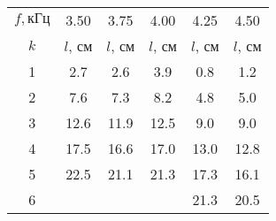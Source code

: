\begin{tabular}{cccccc}
\toprule
$f, \text{кГц}$ & 3.50 & 3.75 & 4.00 & 4.25 & 4.50 \\
$k$ & $l$, см & $l$, см & $l$, см & $l$, см & $l$, см \\
\midrule
1 & 2.7  & 2.6  & 3.9  & 0.8  &	1.2  \\
2 & 7.6  & 7.3  & 8.2  & 4.8  &	5.0  \\
3 & 12.6 & 11.9 & 12.5 & 9.0  &	9.0  \\
4 & 17.5 & 16.6 & 17.0 & 13.0 &	12.8 \\
5 & 22.5 & 21.1 & 21.3 & 17.3 &	16.1 \\
6 & 	 & 		&      & 21.3 &	20.5 \\
\bottomrule
\end{tabular}